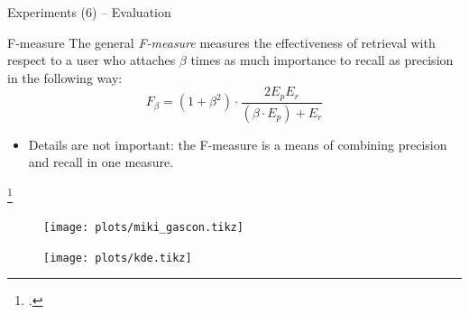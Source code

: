 \documentclass[12pt]{beamer}
\theoremstyle{break}
\begin{document}
\begin{frame}{Experiments (6) -- Evaluation}

	\begin{block}{F-measure}
	    The general \emph{F-measure} measures the effectiveness of retrieval with respect to a user who attaches $\beta$ times as much importance to recall as precision in the following way:\footnotemark
	    \begin{equation*}
	        F_{\beta} = (1 + \beta^{2}) \cdot \frac{2 E_{p} E_{r}}{(\beta \cdot E_{p}) + E_{r}}
	    \end{equation*}
	\end{block}
	
	\begin{itemize}
		\item Details are not important: the F-measure is a means of combining precision and recall in one measure.	
	\end{itemize}

	\footcitetext{Rijsbergen1979}
	
\end{frame}




\begin{frame}

	\begin{table}
		\footnotesize
	    \centering
	    
	\end{table}


\end{frame}




\begin{frame}[plain]

	\begin{figure}
	    \centering
	    \texttt{[image: plots/miki\_gascon.tikz]}
	\end{figure}
	

\end{frame}




\begin{frame}[plain]
	\begin{figure}
	    \centering
	    \texttt{[image: plots/kde.tikz]}
	\end{figure}

\end{frame}
\end{document}
